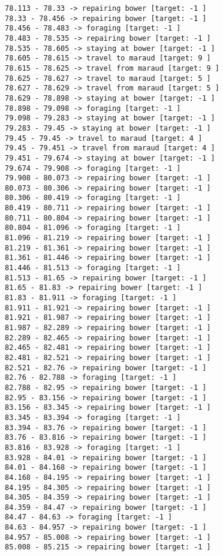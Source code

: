 \documentclass[11pt]{article}
\begin{document}
\begin{Verbatim}[commandchars=\\\{\}]
78.113 - 78.33 -> repairing bower [target: -1 ]
78.33 - 78.456 -> repairing bower [target: -1 ]
78.456 - 78.483 -> foraging [target: -1 ]
78.483 - 78.535 -> repairing bower [target: -1 ]
78.535 - 78.605 -> staying at bower [target: -1 ]
78.605 - 78.615 -> travel to maraud [target: 9 ]
78.615 - 78.625 -> travel from maraud [target: 9 ]
78.625 - 78.627 -> travel to maraud [target: 5 ]
78.627 - 78.629 -> travel from maraud [target: 5 ]
78.629 - 78.898 -> staying at bower [target: -1 ]
78.898 - 79.098 -> foraging [target: -1 ]
79.098 - 79.283 -> staying at bower [target: -1 ]
79.283 - 79.45 -> staying at bower [target: -1 ]
79.45 - 79.45 -> travel to maraud [target: 4 ]
79.45 - 79.451 -> travel from maraud [target: 4 ]
79.451 - 79.674 -> staying at bower [target: -1 ]
79.674 - 79.908 -> foraging [target: -1 ]
79.908 - 80.073 -> repairing bower [target: -1 ]
80.073 - 80.306 -> repairing bower [target: -1 ]
80.306 - 80.419 -> foraging [target: -1 ]
80.419 - 80.711 -> repairing bower [target: -1 ]
80.711 - 80.804 -> repairing bower [target: -1 ]
80.804 - 81.096 -> foraging [target: -1 ]
81.096 - 81.219 -> repairing bower [target: -1 ]
81.219 - 81.361 -> repairing bower [target: -1 ]
81.361 - 81.446 -> repairing bower [target: -1 ]
81.446 - 81.513 -> foraging [target: -1 ]
81.513 - 81.65 -> repairing bower [target: -1 ]
81.65 - 81.83 -> repairing bower [target: -1 ]
81.83 - 81.911 -> foraging [target: -1 ]
81.911 - 81.921 -> repairing bower [target: -1 ]
81.921 - 81.987 -> repairing bower [target: -1 ]
81.987 - 82.289 -> repairing bower [target: -1 ]
82.289 - 82.465 -> repairing bower [target: -1 ]
82.465 - 82.481 -> repairing bower [target: -1 ]
82.481 - 82.521 -> repairing bower [target: -1 ]
82.521 - 82.76 -> repairing bower [target: -1 ]
82.76 - 82.788 -> foraging [target: -1 ]
82.788 - 82.95 -> repairing bower [target: -1 ]
82.95 - 83.156 -> repairing bower [target: -1 ]
83.156 - 83.345 -> repairing bower [target: -1 ]
83.345 - 83.394 -> foraging [target: -1 ]
83.394 - 83.76 -> repairing bower [target: -1 ]
83.76 - 83.816 -> repairing bower [target: -1 ]
83.816 - 83.928 -> foraging [target: -1 ]
83.928 - 84.01 -> repairing bower [target: -1 ]
84.01 - 84.168 -> repairing bower [target: -1 ]
84.168 - 84.195 -> repairing bower [target: -1 ]
84.195 - 84.305 -> repairing bower [target: -1 ]
84.305 - 84.359 -> repairing bower [target: -1 ]
84.359 - 84.47 -> repairing bower [target: -1 ]
84.47 - 84.63 -> foraging [target: -1 ]
84.63 - 84.957 -> repairing bower [target: -1 ]
84.957 - 85.008 -> repairing bower [target: -1 ]
85.008 - 85.215 -> repairing bower [target: -1 ]

\end{Verbatim}
\end{document}
